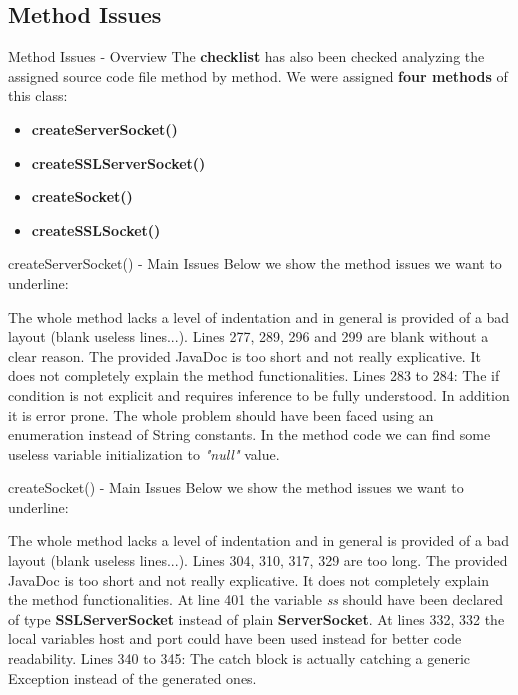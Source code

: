 \documentclass{../common/latex_classes/pdf_presentation}
\begin{document}
	\subsection{Method Issues}
	
	\begin{frame}{Method Issues - Overview}
		The \textbf{checklist} has also been checked analyzing the assigned source code file method by method.
		We were assigned \textbf{four methods} of this class:
		\begin{itemize}
			\item \textbf{createServerSocket()}
			\item \textbf{createSSLServerSocket()}
			\item \textbf{createSocket()}
			\item \textbf{createSSLSocket()}
		\end{itemize}
	\end{frame}
	
	\begin{frame}{createServerSocket() - Main Issues}
		Below we show the method issues we want to underline:
		\begin{itemize}
			 The whole method 	lacks a level of indentation and in general is provided of a bad layout (blank useless lines...).
			 Lines 277, 289, 296 and 299 are blank without a clear reason.
			 The provided JavaDoc is too short and not really explicative. It does not completely explain the method functionalities.
			 Lines 283 to 284: The if condition is not explicit and requires inference to be fully understood. In addition it is error prone. The whole problem should have been faced using an enumeration instead of String constants.
			 In the method code we can find some useless variable initialization to \textit{"null"} value.
		\end{itemize}
	\end{frame}
	
	\begin{frame}{createSocket() - Main Issues}
		Below we show the method issues we want to underline:
		\begin{itemize}
			 The whole method 	lacks a level of indentation and in general is provided of a bad layout (blank useless lines...).
			 Lines 304, 310, 317, 329 are too long.
			 The provided JavaDoc is too short and not really explicative. It does not completely explain the method functionalities.
			 At line 401 the variable \textit{ss} should have been declared of type \textbf{SSLServerSocket} instead of plain \textbf{ServerSocket}.
			 At lines 332, 332 the local variables host and port could have been used instead for better code readability.
			 Lines 340 to 345: The catch block is actually catching a generic Exception instead of the generated ones.
		\end{itemize}
	\end{frame}
	
\end{document}
